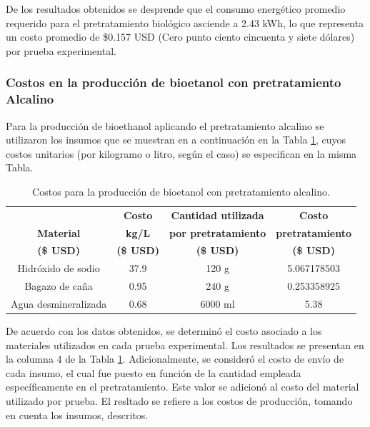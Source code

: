 \documentclass[12pt]{article}
\begin{document}
	
De los resultados obtenidos se desprende que el consumo energético promedio requerido para el pretratamiento biológico asciende a 2.43 kWh, lo que representa un costo promedio de \$0.157 USD (Cero punto ciento cincuenta y siete dólares) por prueba experimental.

	
		\subsubsection{Costos en la producción de bioetanol con pretratamiento Alcalino }
	
	Para la producción de bioethanol aplicando el pretratamiento alcalino se utilizaron los insumos que se muestran en a continuación en la Tabla \ref{Costo para pretratamiento alcalino}, cuyos costos unitarios (por kilogramo o litro, según el caso) se especifican en la misma Tabla.
	
	
	
	\begin{table}[H]
		\centering
		\caption{Costos para la producción de bioetanol con pretratamiento alcalino.}
		\label{Costo para pretratamiento alcalino}
		\setlength{\tabcolsep}{2.5pt}
		\begin{tabular}{|c|c|c|c|}
			\hline
			& \textbf{Costo}& \textbf{Cantidad utilizada }  & \textbf{ Costo} \\
			\textbf{Material}&	\textbf{kg/L} & 	\textbf{por pretratamiento}& \textbf{pretratamiento} \\ 
			\textbf{(\$ USD) }		& \textbf{(\$ USD)} &\textbf{	(\$ USD) }& \textbf{	(\$ USD) }\\ \hline		
			Hidróxido de sodio&37.9& 120 g&5.067178503 \\ \hline
			Bagazo de caña 	  &0.95& 240 g &  0.253358925 \\ \hline
			Agua desmineralizada&0.68& 6000 ml  & 5.38 \\ \hline
		\end{tabular} 
		
		
	\end{table}
	De acuerdo con los datos obtenidos, se determinó el costo asociado a los materiales utilizados en cada prueba experimental. Los resultados se presentan en la columna 4 de la Tabla \ref{Costo para pretratamiento alcalino}. Adicionalmente, se consideró el costo de envío de cada insumo, el cual fue puesto en función de la cantidad empleada específicamente en el pretratamiento. Este valor se adicionó al costo del material utilizado por prueba. El resltado se refiere a los costos de producción, tomando en cuenta los insumos, descritos.
\end{document}
